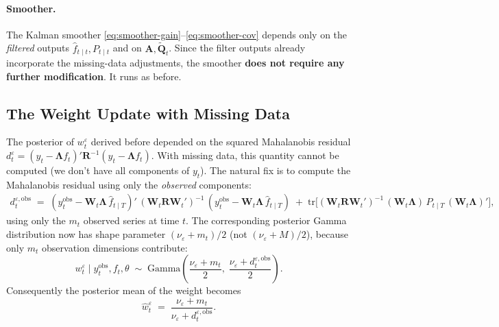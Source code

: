 \documentclass[11pt, a4paper, oneside]{article}
\newcommand{\mL}{\boldsymbol{\Lambda}}
\begin{document}
\paragraph{Smoother.}
The Kalman smoother \eqref{eq:smoother-gain}--\eqref{eq:smoother-cov}
depends only on the \emph{filtered} outputs $\hat{f}_{t \mid t}, P_{t \mid t}$
and on $\mathbf{A}, \tilde{\mathbf{Q}}_t$. Since the filter outputs
already incorporate the missing-data adjustments, the smoother
\textbf{does not require any further modification}. It runs as before.

\subsection{The Weight Update with Missing Data}
\label{subsec:weight-missing}

The posterior of $w^\varepsilon_t$ derived before
depended on the squared Mahalanobis residual $d^\varepsilon_t = (y_t - \mL f_t)' \mathbf{R}^{-1} (y_t - \mL f_t)$. With missing data, this quantity cannot be
computed (we don't have all components of $y_t$). The natural fix is
to compute the Mahalanobis residual using only the \emph{observed}
components:
\begin{equation}
\begin{aligned}
d^{\varepsilon,\mathrm{obs}}_t \;=\; (y_t^{\mathrm{obs}} - \mathbf{W}_t \mL\, \hat{f}_{t \mid T})'\, (\mathbf{W}_t \mathbf{R} \mathbf{W}_t')^{-1}\, (y_t^{\mathrm{obs}} - \mathbf{W}_t \mL\, \hat{f}_{t \mid T}) \;+\; \mathrm{tr}\!\Big[(\mathbf{W}_t \mathbf{R} \mathbf{W}_t')^{-1}\, (\mathbf{W}_t \mL)\, P_{t \mid T}\, (\mathbf{W}_t \mL)'\Big],
\label{eq:d-eps-missing}
\end{aligned}
\end{equation}
using only the $m_t$ observed series at time $t$. The corresponding
posterior Gamma distribution now has shape parameter $(\nu_\varepsilon + m_t)/2$
(not $(\nu_\varepsilon + M)/2$), because only $m_t$ observation dimensions
contribute:
\begin{equation}
\boxed{\;\;
w^\varepsilon_t \;\big|\; y_t^{\mathrm{obs}}, f_t, \theta \;\sim\;
\mathrm{Gamma}\!\left(\frac{\nu_\varepsilon + m_t}{2},\; \frac{\nu_\varepsilon + d^{\varepsilon,\mathrm{obs}}_t}{2}\right).
\;\;}
\label{eq:w-eps-post-missing}
\end{equation}
Consequently the posterior mean of the weight becomes
\begin{equation}
\hat{w}^{\varepsilon}_t \;=\; \frac{\nu_\varepsilon + m_t}{\nu_\varepsilon + d^{\varepsilon,\mathrm{obs}}_t}.
\label{eq:w-eps-hat-missing}
\end{equation}
\end{document}
